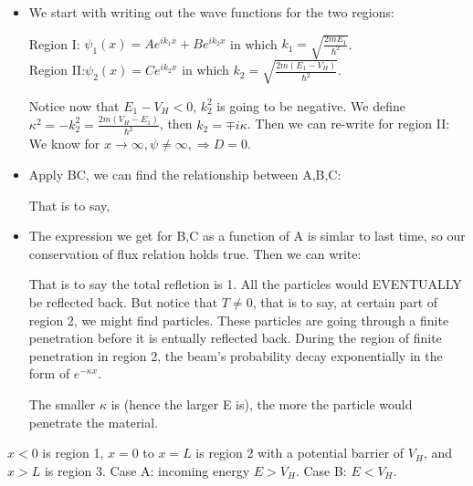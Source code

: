 \documentclass{school-22.101-notes}
\begin{document}
\begin{itemize}
\item We start with writing out the wave functions for the two regions:

Region I: $\psi_1 (x) = A e^{ik_1 x} + B e^{i k_2 x}$ in which $k_1 = \sqrt{\frac{2 m E_1}{\hbar^2}}$. \\
Region II:$\psi_2 (x) = C e^{ik_2 x}$ in which $k_2 = \sqrt{\frac{2 m (E_1 - V_H)}{\hbar^2}}$. 

Notice now that $E_1 - V_H < 0$, $k_2^2$ is going to be negative. We define $\kappa^2 = - k_2^2 = \frac{2 m (V_H - E_1)}{\hbar^2}$, then $k_2 = \mp i \kappa$. Then we can re-write for region II:
We know for $x \to \infty, \psi \neq \infty, \Rightarrow D = 0$. 

\item Apply BC, we can find the relationship between A,B,C:

That is to say,

\item The expression we get for B,C as a function of A is simlar to last time, so our conservation of flux relation holds true. Then we can write: 

That is to say the total refletion is 1. All the particles would EVENTUALLY be reflected back. But notice that $ T \neq 0$, that is to say, at certain part of region 2, we might find particles. These particles are going through a finite penetration before it is entually reflected back. During the region of finite penetration in region 2, the beam's probability decay exponentially in the form of $e^{-\kappa x}$. 

The smaller $\kappa$ is (hence the larger E is), the more the particle would penetrate the material. 
\end{itemize}

$x<0$ is region 1, $x=0$ to $x=L$ is region 2 with a potential barrier of $V_H$, and $x>L$ is region 3. Case A: incoming energy $E > V_H$. Case B: $E < V_H$. 
\end{document}
